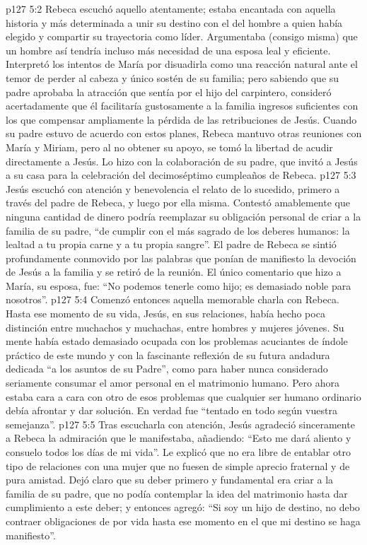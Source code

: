 \vs p127 5:2 Rebeca escuchó aquello atentamente; estaba encantada con aquella historia y más determinada a unir su destino con el del hombre a quien había elegido y compartir su trayectoria como líder. Argumentaba (consigo misma) que un hombre así tendría incluso más necesidad de una esposa leal y eficiente. Interpretó los intentos de María por disuadirla como una reacción natural ante el temor de perder al cabeza y único sostén de su familia; pero sabiendo que su padre aprobaba la atracción que sentía por el hijo del carpintero, consideró acertadamente que él facilitaría gustosamente a la familia ingresos suficientes con los que compensar ampliamente la pérdida de las retribuciones de Jesús. Cuando su padre estuvo de acuerdo con estos planes, Rebeca mantuvo otras reuniones con María y Miriam, pero al no obtener su apoyo, se tomó la libertad de acudir directamente a Jesús. Lo hizo con la colaboración de su padre, que invitó a Jesús a su casa para la celebración del decimoséptimo cumpleaños de Rebeca.
\vs p127 5:3 Jesús escuchó con atención y benevolencia el relato de lo sucedido, primero a través del padre de Rebeca, y luego por ella misma. Contestó amablemente que ninguna cantidad de dinero podría reemplazar su obligación personal de criar a la familia de su padre, “de cumplir con el más sagrado de los deberes humanos: la lealtad a tu propia carne y a tu propia sangre”. El padre de Rebeca se sintió profundamente conmovido por las palabras que ponían de manifiesto la devoción de Jesús a la familia y se retiró de la reunión. El único comentario que hizo a María, su esposa, fue: “No podemos tenerle como hijo; es demasiado noble para nosotros”.
\vs p127 5:4 Comenzó entonces aquella memorable charla con Rebeca. Hasta ese momento de su vida, Jesús, en sus relaciones, había hecho poca distinción entre muchachos y muchachas, entre hombres y mujeres jóvenes. Su mente había estado demasiado ocupada con los problemas acuciantes de índole práctico de este mundo y con la fascinante reflexión de su futura andadura dedicada “a los asuntos de su Padre”, como para haber nunca considerado seriamente consumar el amor personal en el matrimonio humano. Pero ahora estaba cara a cara con otro de esos problemas que cualquier ser humano ordinario debía afrontar y dar solución. En verdad fue “tentado en todo según vuestra semejanza”.
\vs p127 5:5 Tras escucharla con atención, Jesús agradeció sinceramente a Rebeca la admiración que le manifestaba, añadiendo: “Esto me dará aliento y consuelo todos los días de mi vida”. Le explicó que no era libre de entablar otro tipo de relaciones con una mujer que no fuesen de simple aprecio fraternal y de pura amistad. Dejó claro que su deber primero y fundamental era criar a la familia de su padre, que no podía contemplar la idea del matrimonio hasta dar cumplimiento a este deber; y entonces agregó: “Si soy un hijo de destino, no debo contraer obligaciones de por vida hasta ese momento en el que mi destino se haga manifiesto”.
